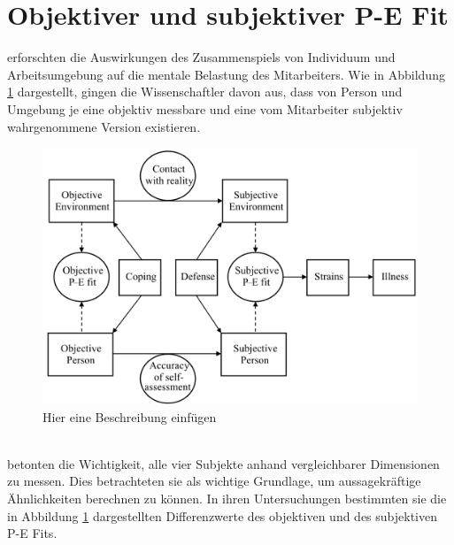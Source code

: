 \section{Objektiver und subjektiver P-E Fit}
\label{ch:personEnvironmentFit:subjektivObjektiv}
\textcite{copingAndAdaption:1974} erforschten die Auswirkungen des Zusammenspiels von Individuum und Arbeitsumgebung auf die mentale Belastung des Mitarbeiters. Wie in Abbildung \ref{fig:personEnvironmentFit:subjektivObjektiv:abb1} dargestellt, gingen die Wissenschaftler davon aus, dass von Person und Umgebung je eine objektiv messbare und eine vom Mitarbeiter subjektiv wahrgenommene Version existieren. \\
\begin{figure}[h]
	\centering
	\includegraphics[width=1\textwidth]{gfx/subjektivObjektivPEFit.png}
	\caption{Hier eine Beschreibung einfügen \cite[S. 22]{edwards:2008}}
	\label{fig:personEnvironmentFit:subjektivObjektiv:abb1}
\end{figure}
\\
\textcite{copingAndAdaption:1974} betonten die Wichtigkeit, alle vier Subjekte anhand vergleichbarer Dimensionen zu messen. Dies betrachteten sie als wichtige Grundlage, um aussagekräftige Ähnlichkeiten berechnen zu können. In ihren Untersuchungen bestimmten sie die in Abbildung \ref{fig:personEnvironmentFit:subjektivObjektiv:abb1} dargestellten Differenzwerte des objektiven und des subjektiven P-E Fits.\\
